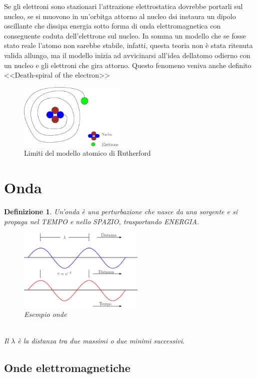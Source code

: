 \documentclass{book}
\newtheorem{defi}{Definizione}[section]
\begin{document}
Se gli elettroni sono stazionari l'attrazione elettrostatica dovrebbe portarli sul nucleo, se si
muovono in un'orbitga attorno al nucleo dsi instaura un dipolo oscillante che dissipa energia sotto
forma di onda elettromagnetica con conseguente coduta dell'elettrone sul nucleo. In somma un modello
che se fosse stato reale l'atomo non sarebbe stabile, infatti, questa teoria non è stata ritenuta valida
allungo, ma il modello inizia ad avvicinarsi all'idea dellatomo odierno con un nucleo e gli elettroni
che gira attorno. Questo fenomeno veniva anche definito <<Death-spiral of the electron>>
\begin{figure}[ht!]
  \centering
  \includegraphics[width=5cm]{img/instmodRuth.eps}
  \caption[limModAtom]{Limiti del modello atomico di Rutherford}
  \label{fig:limModAtom}
\end{figure}
\clearpage
\section{Onda}
\label{sec:onde}
\begin{defi}
  Un’onda è una perturbazione che nasce da una sorgente e si propaga nel TEMPO e nello SPAZIO,
  trasportando ENERGIA.
  \begin{figure}[ht!]
    \centering
    \includegraphics[width=6cm]{img/segnali.eps}
    \caption{Esempio onde}
    \label{fig:esonde}
  \end{figure}\\
  Il $\lambda$ è la distanza tra due massimi o due minimi successivi. 
\end{defi}

\subsection{Onde elettromagnetiche}
\label{sec:ondeElettro}
\end{document}
